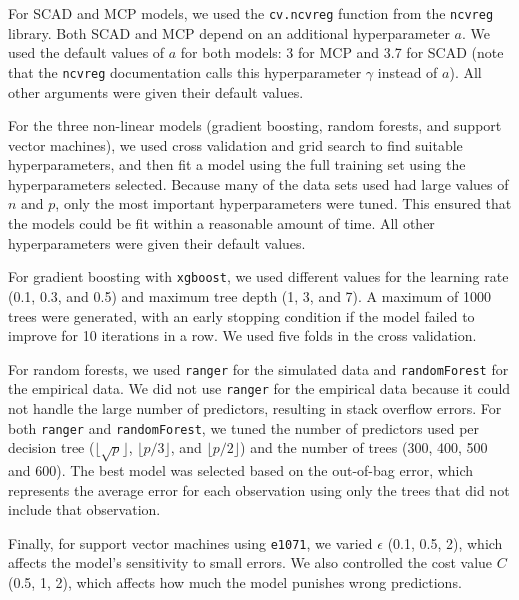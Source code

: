 \documentclass{article}
\begin{document}
	For SCAD and MCP models, we used the \lstinline!cv.ncvreg! function from the \lstinline!ncvreg! library. Both SCAD and MCP depend on an additional hyperparameter $a$. We used the default values of $a$ for both models: 3 for MCP and 3.7 for SCAD (note that the \lstinline!ncvreg! documentation calls this hyperparameter $\gamma$ instead of $a$). All other arguments were given their default values. 
	
	For the three non-linear models (gradient boosting, random forests, and support vector machines), we used cross validation and grid search to find suitable hyperparameters, and then fit a model using the full training set using the hyperparameters selected. Because many of the data sets used had large values of $n$ and $p$, only the most important hyperparameters were tuned. This ensured that the models could be fit within a reasonable amount of time. All other hyperparameters were given their default values.
	
	For gradient boosting with \lstinline!xgboost!, we used different values for the learning rate (0.1, 0.3, and 0.5) and maximum tree depth (1, 3, and 7). A maximum of 1000 trees were generated, with an early stopping condition if the model failed to improve for 10 iterations in a row. We used five folds in the cross validation.
	
	For random forests, we used \lstinline!ranger! for the simulated data and \lstinline!randomForest! for the empirical data. We did not use \lstinline!ranger! for the empirical data because it could not handle the large number of predictors, resulting in stack overflow errors. For both \lstinline!ranger! and \lstinline!randomForest!, we tuned the number of predictors used per decision tree ($\lfloor \sqrt{p}\rfloor$, $\lfloor p / 3 \rfloor$, and $\lfloor p / 2 \rfloor$) and the number of trees (300, 400, 500 and 600). The best model was selected based on the out-of-bag error, which represents the average error for each observation using only the trees that did not include that observation.
	
	Finally, for support vector machines using \lstinline!e1071!, we varied $\epsilon$ (0.1, 0.5, 2), which affects the model's sensitivity to small errors. We also controlled the cost value $C$ (0.5, 1, 2), which affects how much the model punishes wrong predictions.
	
\end{document}

